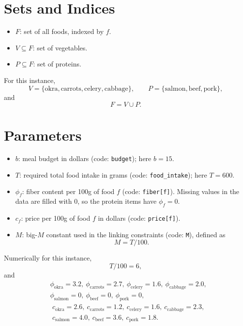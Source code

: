 \section*{Sets and Indices}

\begin{itemize}
    \item $F$: set of all foods, indexed by $f$.
    \item $V \subseteq F$: set of vegetables.
    \item $P \subseteq F$: set of proteins.
\end{itemize}

For this instance,
\[
V=\{\text{okra},\text{carrots},\text{celery},\text{cabbage}\},\qquad
P=\{\text{salmon},\text{beef},\text{pork}\},
\]
and
\[
F = V \cup P.
\]

\section*{Parameters}

\begin{itemize}
    \item $b$: meal budget in dollars (code: \texttt{budget}); here $b=15$.
    \item $T$: required total food intake in grams (code: \texttt{food\_intake}); here $T=600$.
    \item $\phi_f$: fiber content per 100g of food $f$ (code: \texttt{fiber[f]}). Missing values in the data are filled with $0$, so the protein items have $\phi_f=0$.
    \item $c_f$: price per 100g of food $f$ in dollars (code: \texttt{price[f]}).
    \item $M$: big-$M$ constant used in the linking constraints (code: \texttt{M}), defined as
    \[
    M = T/100.
    \]
\end{itemize}

Numerically for this instance,
\[
T/100 = 6,
\]
and
\[
\begin{aligned}
&\phi_{\text{okra}}=3.2,\ \phi_{\text{carrots}}=2.7,\ \phi_{\text{celery}}=1.6,\ \phi_{\text{cabbage}}=2.0,\\
&\phi_{\text{salmon}}=0,\ \phi_{\text{beef}}=0,\ \phi_{\text{pork}}=0,
\end{aligned}
\]
\[
\begin{aligned}
&c_{\text{okra}}=2.6,\ c_{\text{carrots}}=1.2,\ c_{\text{celery}}=1.6,\ c_{\text{cabbage}}=2.3,\\
&c_{\text{salmon}}=4.0,\ c_{\text{beef}}=3.6,\ c_{\text{pork}}=1.8.
\end{aligned}
\]

